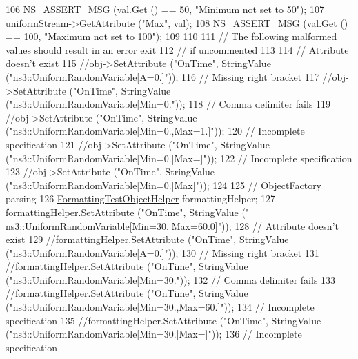 \begin{DoxyCode}
106   \hyperlink{assert_8h_aff5ece9066c74e681e74999856f08539}{NS\_ASSERT\_MSG} (val.Get () == 50, \textcolor{stringliteral}{"Minimum not set to 50"});
107   uniformStream->\hyperlink{classns3_1_1ObjectBase_a895d1de2f96063d0e0fd78463e7a7e30}{GetAttribute} (\textcolor{stringliteral}{"Max"}, val);
108   \hyperlink{assert_8h_aff5ece9066c74e681e74999856f08539}{NS\_ASSERT\_MSG} (val.Get () == 100, \textcolor{stringliteral}{"Maximum not set to 100"});
109 
110 
111   \textcolor{comment}{// The following malformed values should result in an error exit}
112   \textcolor{comment}{// if uncommented}
113 
114   \textcolor{comment}{// Attribute doesn't exist}
115   \textcolor{comment}{//obj->SetAttribute ("OnTime", StringValue ("ns3::UniformRandomVariable[A=0.]"));}
116   \textcolor{comment}{// Missing right bracket}
117   \textcolor{comment}{//obj->SetAttribute ("OnTime", StringValue ("ns3::UniformRandomVariable[Min=0."));}
118   \textcolor{comment}{// Comma delimiter fails}
119   \textcolor{comment}{//obj->SetAttribute ("OnTime", StringValue ("ns3::UniformRandomVariable[Min=0.,Max=1.]"));}
120   \textcolor{comment}{// Incomplete specification}
121   \textcolor{comment}{//obj->SetAttribute ("OnTime", StringValue ("ns3::UniformRandomVariable[Min=0.|Max=]"));}
122   \textcolor{comment}{// Incomplete specification}
123   \textcolor{comment}{//obj->SetAttribute ("OnTime", StringValue ("ns3::UniformRandomVariable[Min=0.|Max]"));}
124 
125   \textcolor{comment}{// ObjectFactory parsing}
126   \hyperlink{classFormattingTestObjectHelper}{FormattingTestObjectHelper} formattingHelper;
127   formattingHelper.\hyperlink{classFormattingTestObjectHelper_a8d4707dad43d9743bd98d1ffc8663e65}{SetAttribute} (\textcolor{stringliteral}{"OnTime"}, StringValue (\textcolor{stringliteral}{"
      ns3::UniformRandomVariable[Min=30.|Max=60.0]"}));
128   \textcolor{comment}{// Attribute doesn't exist}
129   \textcolor{comment}{//formattingHelper.SetAttribute ("OnTime", StringValue ("ns3::UniformRandomVariable[A=0.]"));}
130   \textcolor{comment}{// Missing right bracket}
131   \textcolor{comment}{//formattingHelper.SetAttribute ("OnTime", StringValue ("ns3::UniformRandomVariable[Min=30."));}
132   \textcolor{comment}{// Comma delimiter fails}
133   \textcolor{comment}{//formattingHelper.SetAttribute ("OnTime", StringValue ("ns3::UniformRandomVariable[Min=30.,Max=60.]"));}
134   \textcolor{comment}{// Incomplete specification}
135   \textcolor{comment}{//formattingHelper.SetAttribute ("OnTime", StringValue ("ns3::UniformRandomVariable[Min=30.|Max=]"));}
136   \textcolor{comment}{// Incomplete specification}

\end{DoxyCode}
